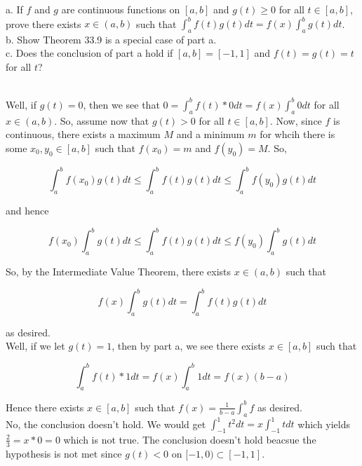 a. If $f$ and $g$ are continuous functions on $[a,b]$ and $g(t)\geq0$ for all $t\in[a,b]$, prove there
exists $x\in(a,b)$ such that $\int_a^bf(t)g(t)dt=f(x)\int_a^bg(t)dt$.\\

b. Show Theorem 33.9 is a special case of part a.\\

c. Does the conclusion of part a hold if $[a,b]=[-1,1]$ and $f(t)=g(t)=t$ for all $t$?\\

\begin{solution}\renewcommand{\qedsymbol}{}\ \\
    Well, if $g(t)=0$, then we see that $0=\int_a^bf(t)*0dt=f(x)\int_a^b0dt$ for all $x\in(a,b)$. So,
    assume now that $g(t)>0$ for all $t\in[a,b]$. Now, since $f$ is continuous, there exists a maximum
    $M$ and a minimum $m$ for whcih there is some $x_0,y_0\in[a,b]$ such that $f(x_0)=m$ and $f(y_0)=M$.
    So,
    
    $$\int_a^bf(x_0)g(t)dt\leq\int_a^bf(t)g(t)dt\leq\int_a^bf(y_0)g(t)dt$$
    
    and hence
    
    $$f(x_0)\int_a^bg(t)dt\leq\int_a^bf(t)g(t)dt\leq f(y_0)\int_a^bg(t)dt$$
    
    So, by the Intermediate Value Theorem, there exists $x\in(a,b)$ such that
    
    $$f(x)\int_a^bg(t)dt=\int_a^bf(t)g(t)dt$$
    
    as desired.\\

    Well, if we let $g(t)=1$, then by part a, we see there exists $x\in[a,b]$ such that
    
    $$\int_a^bf(t)*1dt=f(x)\int_a^b1dt=f(x)(b-a)$$
    
    Hence there exists $x\in[a,b]$ such that $f(x)=\frac{1}{b-a}\int_a^bf$ as desired.\\

    No, the conclusion doesn't hold. We would get $\int_{-1}^1t^2dt=x\int_{-1}^1tdt$ which yields
    $\frac23=x*0=0$ which is not true. The conclusion doesn't hold beacsue the hypothesis is not met
    since $g(t)<0$ on $[-1,0)\subset[-1,1]$.

\end{solution}